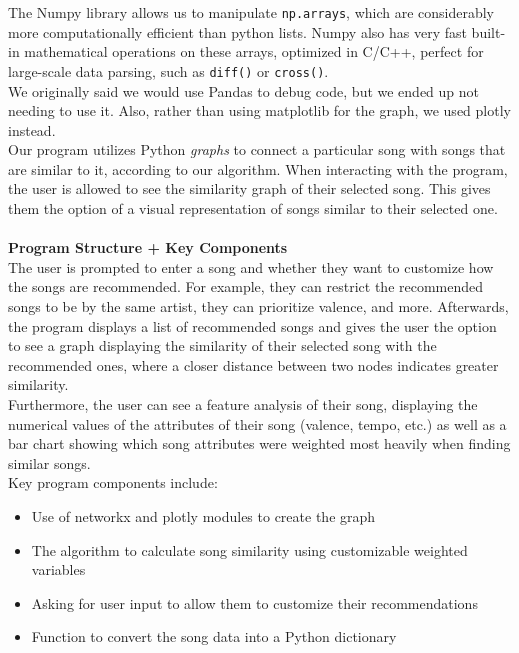 \documentclass[fontsize=11pt]{article}
\begin{document}
The Numpy library allows us to manipulate \texttt{np.arrays}, which are considerably more computationally efficient than python lists. Numpy also has very fast built-in mathematical operations on these arrays, optimized in C/C++, perfect for large-scale data parsing, such as \texttt{diff()} or \texttt{cross()}. \\
We originally said we would use Pandas to debug code, but we ended up not needing to use it. Also, rather than using matplotlib for the graph, we used plotly instead.\\
Our program utilizes Python \textit{graphs} to connect a particular song with songs that are similar to it, according to our algorithm. When interacting with the program, the user is allowed to see the similarity graph of their selected song. This gives them the option of a visual representation of songs similar to their selected one. \\

\\
\textbf{Program Structure + Key Components}
\\
The user is prompted to enter a song and whether they want to customize how the songs are recommended. For example, they can restrict the recommended songs to be by the same artist, they can prioritize valence, and more. Afterwards, the program displays a list of recommended songs and gives the user the option to see a graph displaying the similarity of their selected song with the recommended ones, where a closer distance between two nodes indicates greater similarity.\\
Furthermore, the user can see a feature analysis of their song, displaying the numerical values of the attributes of their song (valence, tempo, etc.) as well as a bar chart showing which song attributes were weighted most heavily when finding similar songs.\\
Key program components include:
\begin{itemize}
    \item Use of networkx and plotly modules to create the graph
    \item The algorithm to calculate song similarity using customizable weighted variables
    \item Asking for user input to allow them to customize their recommendations
    \item Function to convert the song data into a Python dictionary
\end{itemize}
\end{document}
